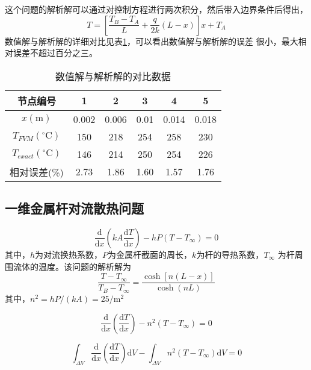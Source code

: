 这个问题的解析解可以通过对控制方程进行两次积分，然后带入边界条件后得出，
\begin{equation}
  T 
  =
  \left[
    \frac{T_{B}-T_{A}}{L}
    +
    \frac{q}{2k}(L-x)
  \right]x
  +
  T_{A}
\end{equation}
数值解与解析解的详细对比见表\ref{TbFV_ex2_compare}，可以看出数值解与解析解的误差
很小，最大相对误差不超过百分之三。
\begin{table}[H]
  \begin{center}
  \caption{数值解与解析解的对比数据}
  \label{TbFV_ex2_compare}
  \begin{tabular}{|c|c|c|c|c|c|}
    \hline
    节点编号 & 1 & 2 & 3 & 4 & 5 \\
    \hline
    $x(\mathrm{m})$ & 0.002 & 0.006 & 0.01 & 0.014 & 0.018 \\
    \hline
    $T_{FVM}(^{\circ}\mathrm{C})$ & 150 & 218 & 254 & 258 & 230 \\
    \hline
    $T_{exact}(^{\circ}\mathrm{C})$ & 146 & 214 & 250 & 254 & 226 \\
    \hline
    相对误差(\%) & 2.73 & 1.86 & 1.60 & 1.57 & 1.76 \\
    \hline
  \end{tabular}
  \end{center}
\end{table}

\subsection{一维金属杆对流散热问题}

\begin{equation}
  \frac{\mathrm{d}}{\mathrm{d}x}
  \left(
    kA\frac{\mathrm{d}T}{\mathrm{d}x}
  \right)
  -
  hP(T-T_{\infty})
  =
  0
\end{equation}
其中，$h$为对流换热系数，$P$为金属杆截面的周长，$k$为杆的导热系数，$T_{\infty}$
为杆周围流体的温度。该问题的解析解为
\begin{equation}
  \frac{T-T_{\infty}}{T_{B}-T_{\infty}}
  =
  \frac{\cosh{[n(L-x)]}}{\cosh{(nL)}}
\end{equation}
其中，$n^{2}=hP/(kA)=25/{\mathrm{m^{2}}}$

\begin{equation}
  \frac{\mathrm{d}}{\mathrm{d}x}
  \left(
  \frac{\mathrm{d}T}{\mathrm{d}x}
  \right)
  -
  n^{2}(T-T_{\infty})
  =
  0
\end{equation}

\begin{equation}
  \int_{\Delta V}\!
  \frac{\mathrm{d}}{\mathrm{d}x}
  \left(
  \frac{\mathrm{d}T}{\mathrm{d}x}
  \right)
  \mathrm{d}V
  -
  \int_{\Delta V}\!
  n^{2}(T-T_{\infty})
  \mathrm{d}V
  =
  0
\end{equation}

